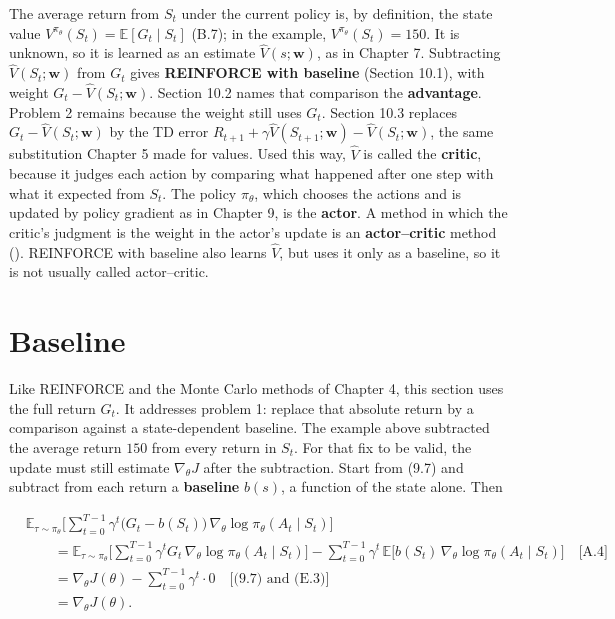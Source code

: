 The average return from $S_t$ under the current policy is, by definition, the state value $V^{\pi_\theta}(S_t)=\mathbb{E}[G_t\mid S_t]$ (B.7); in the example, $V^{\pi_\theta}(S_t)=150$. It is unknown, so it is learned as an estimate $\hat{V}(s;\mathbf{w})$, as in Chapter 7. Subtracting $\hat{V}(S_t;\mathbf{w})$ from $G_t$ gives \textbf{REINFORCE with baseline} (Section 10.1), with weight $G_t-\hat{V}(S_t;\mathbf{w})$. Section 10.2 names that comparison the \textbf{advantage}. Problem 2 remains because the weight still uses $G_t$. Section 10.3 replaces $G_t-\hat{V}(S_t;\mathbf{w})$ by the TD error $R_{t+1}+\gamma\hat{V}(S_{t+1};\mathbf{w})-\hat{V}(S_t;\mathbf{w})$, the same substitution Chapter 5 made for values. Used this way, $\hat{V}$ is called the \textbf{critic}, because it judges each action by comparing what happened after one step with what it expected from $S_t$. The policy $\pi_\theta$, which chooses the actions and is updated by policy gradient as in Chapter 9, is the \textbf{actor}. A method in which the critic's judgment is the weight in the actor's update is an \textbf{actor--critic} method (). REINFORCE with baseline also learns $\hat{V}$, but uses it only as a baseline, so it is not usually called actor--critic.

\section{Baseline}

Like REINFORCE and the Monte Carlo methods of Chapter 4, this section uses the full return $G_t$. It addresses problem 1: replace that absolute return by a comparison against a state-dependent baseline. The example above subtracted the average return $150$ from every return in $S_t$. For that fix to be valid, the update must still estimate $\nabla_\theta J$ after the subtraction. Start from (9.7) and subtract from each return a \textbf{baseline} $b(s)$, a function of the state alone. Then

\[
\begin{aligned}
&\mathbb{E}_{\tau\sim\pi_\theta}\Biggl[
\sum_{t=0}^{T-1}
\gamma^{t}\bigl(G_t-b(S_t)\bigr)\,\nabla_\theta\log\pi_\theta(A_t\mid S_t)
\Biggr]
\\
&\qquad=
\mathbb{E}_{\tau\sim\pi_\theta}\Biggl[
\sum_{t=0}^{T-1}
\gamma^{t}G_t\,\nabla_\theta\log\pi_\theta(A_t\mid S_t)
\Biggr]
-
\sum_{t=0}^{T-1}\gamma^{t}\,
\mathbb{E}\bigl[
b(S_t)\,\nabla_\theta\log\pi_\theta(A_t\mid S_t)
\bigr]
\quad\text{[A.4]}
\\
&\qquad=
\nabla_\theta J(\theta)
-
\sum_{t=0}^{T-1}\gamma^{t}\cdot 0
\quad\text{[(9.7) and (E.3)]}
\\
&\qquad=
\nabla_\theta J(\theta).
\end{aligned}
\]

